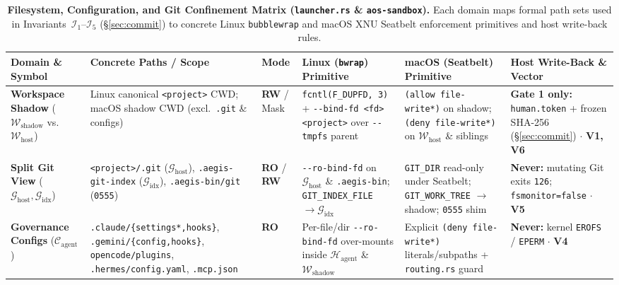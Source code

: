 \documentclass[10pt,twocolumn]{article}
\begin{document}
\begin{table}[!t]
\centering
\caption{\textbf{Filesystem, Configuration, and Git Confinement Matrix (\texttt{launcher.rs} \& \texttt{aos-sandbox}).} Each domain maps formal path sets used in Invariants~$\mathcal{I}_1$--$\mathcal{I}_5$ (\S\ref{sec:commit}) to concrete Linux \texttt{bubblewrap} and macOS XNU Seatbelt enforcement primitives and host write-back rules.}
\label{tab:vfs_map}
\vspace{2pt}
\scriptsize
\setlength{\tabcolsep}{3.2pt}
\begin{tabularx}{\textwidth}{@{}>{\raggedright\arraybackslash}p{2.30cm}>{\raggedright\arraybackslash}p{3.10cm}lYY>{\raggedright\arraybackslash}p{2.95cm}@{}}
\toprule
\textbf{Domain \& Symbol} & \textbf{Concrete Paths / Scope} & \textbf{Mode} & \textbf{Linux (\texttt{bwrap}) Primitive} & \textbf{macOS (Seatbelt) Primitive} & \textbf{Host Write-Back \& Vector} \\
\midrule
\textbf{Workspace Shadow} ($\mathcal{W}_{\text{shadow}}$ vs.\ $\mathcal{W}_{\text{host}}$) & Linux canonical \texttt{<project>} CWD; macOS shadow CWD (excl.\ \texttt{.git} \& configs) & \textbf{RW} / Mask & \texttt{fcntl(F\_DUPFD, 3)} + \texttt{-\/-bind-fd <fd> <project>} over \texttt{-\/-tmpfs} parent & \texttt{(allow file-write*)} on shadow; \texttt{(deny file-write*)} on $\mathcal{W}_{\text{host}}$ \& siblings & \textbf{Gate 1 only:} \texttt{human.token} + frozen SHA-256 (\S\ref{sec:commit}) $\cdot$ \textbf{V1, V6} \\
\addlinespace[2pt]
\textbf{Split Git View} ($\mathcal{G}_{\text{host}}, \mathcal{G}_{\text{idx}}$) & \texttt{<project>/.git} ($\mathcal{G}_{\text{host}}$), \texttt{.aegis-git-index} ($\mathcal{G}_{\text{idx}}$), \texttt{.aegis-bin/git} (\texttt{0555}) & \textbf{RO} / \textbf{RW} & \texttt{-\/-ro-bind-fd} on $\mathcal{G}_{\text{host}}$ \& \texttt{.aegis-bin}; \texttt{GIT\_INDEX\_FILE} $\to \mathcal{G}_{\text{idx}}$ & \texttt{GIT\_DIR} read-only under Seatbelt; \texttt{GIT\_WORK\_TREE} $\to$ shadow; \texttt{0555} shim & \textbf{Never:} mutating Git exits \texttt{126}; \texttt{fsmonitor=false} $\cdot$ \textbf{V5} \\
\addlinespace[2pt]
\textbf{Governance Configs} ($\mathcal{C}_{\text{agent}}$) & \texttt{.claude/\allowbreak\{settings*,\allowbreak hooks\}}, \texttt{.gemini/\allowbreak\{config,\allowbreak hooks\}}, \texttt{opencode/plugins}, \texttt{.hermes/config.yaml}, \texttt{.mcp.json} & \textbf{RO} & Per-file/dir \texttt{-\/-ro-bind-fd} over-mounts inside $\mathcal{H}_{\text{agent}}$ \& $\mathcal{W}_{\text{shadow}}$ & Explicit \texttt{(deny file-write*)} literals/subpaths + \texttt{routing.rs} guard & \textbf{Never:} kernel \texttt{EROFS} / \texttt{EPERM} $\cdot$ \textbf{V4} \\

\end{tabularx}
\end{table}
\end{document}
